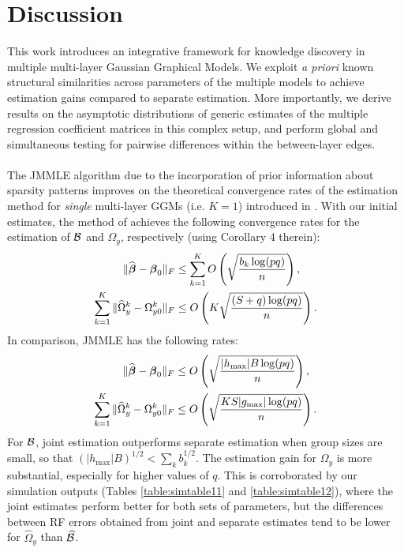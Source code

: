 \section{Discussion}
\label{sec:sec5}
This work introduces an integrative framework for knowledge discovery in multiple multi-layer Gaussian Graphical Models. We exploit {\it a priori} known structural similarities across parameters of the multiple models to achieve estimation gains compared to separate estimation. More importantly, we derive results on the asymptotic distributions of generic estimates of the multiple regression coefficient matrices in this complex setup, and perform global and simultaneous testing for pairwise differences within the between-layer edges.

\paragraph{}
The JMMLE algorithm due to the incorporation of prior information about sparsity patterns improves on the theoretical convergence rates of the estimation method for {\it single} multi-layer GGMs (i.e. $K=1$) introduced in \cite{LinEtal16}. With our initial estimates, the method of \cite{LinEtal16} achieves the following convergence rates for the estimation of ${\cal{B}}$ and $\Omega_y$, respectively (using Corollary 4 therein):
%
\begin{align*}
\| \widehat {{\boldsymbol{\beta}}} - {\boldsymbol{\beta}}_0 \|_F & \leq \sum_{k=1}^K O \left( \sqrt{ \frac{ b_k \log (p q)}{n}} \right), \\
\sum_{k=1}^K \| \widehat \Omega_y^k - \Omega_{y0}^k \|_F & \leq O \left( K \sqrt{ \frac{ (S + q) \log (pq)}{n}} \right).
\end{align*}
%
In comparison, JMMLE has the following rates:
%
\begin{align*}
\| \widehat {{\boldsymbol{\beta}}} - {\boldsymbol{\beta}}_0 \|_F & \leq O \left( \sqrt{ \frac{ |h_{\max}| B \log (p q)}{n}} \right), \\
\sum_{k=1}^K \| \widehat \Omega_y^k - \Omega_{y0}^k \|_F & \leq O \left( \sqrt{ \frac{ KS |g_{\max}| \log (p q)}{n}} \right).
\end{align*}
%
For ${\cal{B}}$, joint estimation outperforms separate estimation when group sizes are small, so that $(| h_{\max}| B)^{1/2} < \sum_k b_k^{1/2}$. The estimation gain for $\Omega_y$ is more substantial, especially for higher values of $q$. This is corroborated by our simulation outputs (Tables \ref{table:simtable11} and \ref{table:simtable12}), where the joint estimates perform better for both sets of parameters, but the differences between RF errors obtained from joint and separate estimates tend to be lower for $\widehat \Omega_y$ than $\widehat {{\cal{B}}}$.

